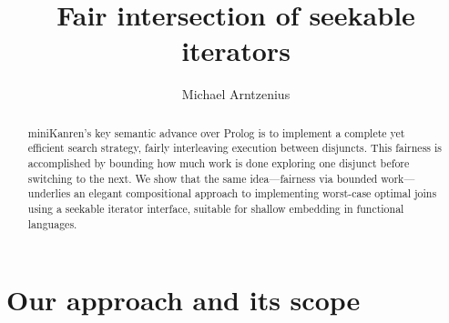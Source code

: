 \documentclass[acmsmall,screen,dvipsnames,svgnames]{acmart}
\title{Fair intersection of seekable iterators}
\author{Michael Arntzenius}
\affiliation{%
	\institution{UC Berkeley}
	\city{Berkeley}
	\state{CA}
	\country{USA}
}
\begin{document}
\renewcommand\footnotetextcopyrightpermission[1]{}
\pagestyle{fancy}
\fancyfoot{}
\makeatletter
\let\@authorsaddresses\@empty
\makeatother

\begin{abstract}
  miniKanren's key semantic advance over Prolog is to implement a complete yet efficient search strategy, fairly interleaving execution between disjuncts.
  This fairness is accomplished by bounding how much work is done exploring one disjunct before switching to the next.
  We show that the same idea---fairness via bounded work---underlies an elegant compositional approach to implementing worst-case optimal joins using a seekable iterator interface, suitable for shallow embedding in functional languages.
\end{abstract}

\maketitle

\thispagestyle{firstfancy}


\section{Our approach and its scope}

\end{document}
